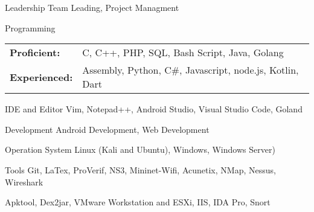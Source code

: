 

\begin{cvskills}

    \cvskill
    {Leadership}
    {Team Leading, Project Managment}
    
    \cvskill
    {Programming}
    {
        \setlength{\tabcolsep}{5pt}
        \begin{tabular}{|l l}
            \textbf{Proficient:} & C, C++, PHP, SQL, Bash Script, Java, Golang \\ 
            \textbf{Experienced:} & Assembly, Python, C\#, Javascript, node.js, Kotlin, Dart 
        \end{tabular}
    }

    \cvskill
    {IDE and Editor}
    {Vim, Notepad++, Android Studio, Visual Studio Code, Goland}
    
    \cvskill
    {Development}
    {Android Development, Web Development}
    
    \cvskill
    {Operation System}
    {Linux (Kali and Ubuntu), Windows, Windows Server)}

    \cvskill
    {Tools}
    {Git, LaTex, ProVerif, NS3, Mininet-Wifi, Acunetix, NMap, Nessus, Wireshark}
    
    \cvskill
    {}
    {Apktool, Dex2jar, VMware Workstation and ESXi, IIS, IDA Pro, Snort}

    

\end{cvskills}
